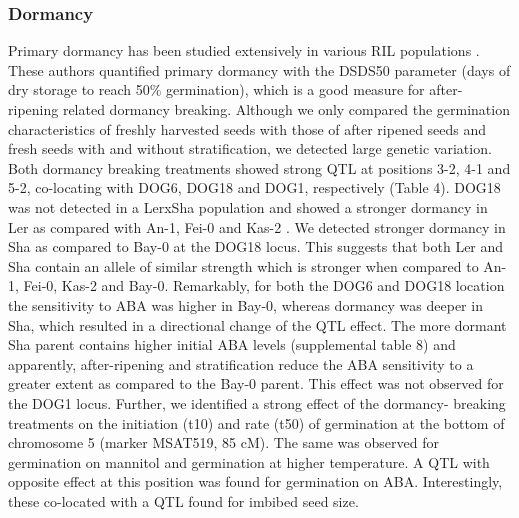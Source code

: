 \documentclass[8pt, twoside, a5paper]{report}
\begin{document}
\subsubsection{Dormancy}
Primary dormancy has been studied extensively in various RIL populations \cite{Bentsink:2010}. These authors quantified primary dormancy with the DSDS50
parameter (days of dry storage to reach 50\% germination), which is a good measure for after-ripening related dormancy breaking. Although we only compared the germination
characteristics of freshly harvested seeds with those of after ripened seeds and fresh seeds with and without stratification, we detected large genetic variation. Both dormancy
breaking treatments showed strong QTL at positions 3-2, 4-1 and 5-2, co-locating with DOG6, DOG18 and DOG1, respectively (Table 4).
DOG18 was not detected in a LerxSha population and showed a stronger dormancy in Ler as compared with An-1, Fei-0 and Kas-2 \cite{Bentsink:2010}. We detected stronger 
dormancy in Sha as compared to Bay-0 at the DOG18 locus. This suggests that both Ler and Sha contain an allele of similar strength which is stronger when compared to An-1, Fei-0, 
Kas-2 and Bay-0. Remarkably, for both the DOG6 and DOG18 location the sensitivity to ABA was higher in Bay-0, whereas dormancy was deeper in Sha, which resulted in a directional
change of the QTL effect. The more dormant Sha parent contains higher initial ABA levels (supplemental table 8) and apparently, after-ripening and stratification reduce the
ABA sensitivity to a greater extent as compared to the Bay-0 parent. This effect was not observed for the DOG1 locus. Further, we identified a strong effect of the dormancy-
breaking treatments on the initiation (t10) and rate (t50) of germination at the bottom of chromosome 5 (marker MSAT519, 85 cM). The same was observed for germination on
mannitol and germination at higher temperature. A QTL with opposite effect at this position was found for germination on ABA. Interestingly, these co-located with a QTL
found for imbibed seed size. 
\end{document}
